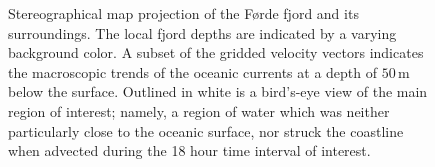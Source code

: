 \begin{figure}[htpb]
    \centering
    \caption[Stereographical map projection of the Førde fjord and its
    surroundings]
    {Stereographical map projection of the Førde fjord and its surroundings.
        The local fjord depths are indicated by a varying background color. A
        subset of the gridded velocity vectors indicates the macroscopic trends
        of the oceanic currents at a depth of $50\,\si{\meter}$ below the
        surface. Outlined in white is a bird's-eye view of the main region of
        interest; namely, a region of water which was neither particularly
        close to the oceanic surface, nor struck the coastline when advected
        during the 18 hour time interval of interest.}
    \label{fig:currentmap}
\end{figure}

